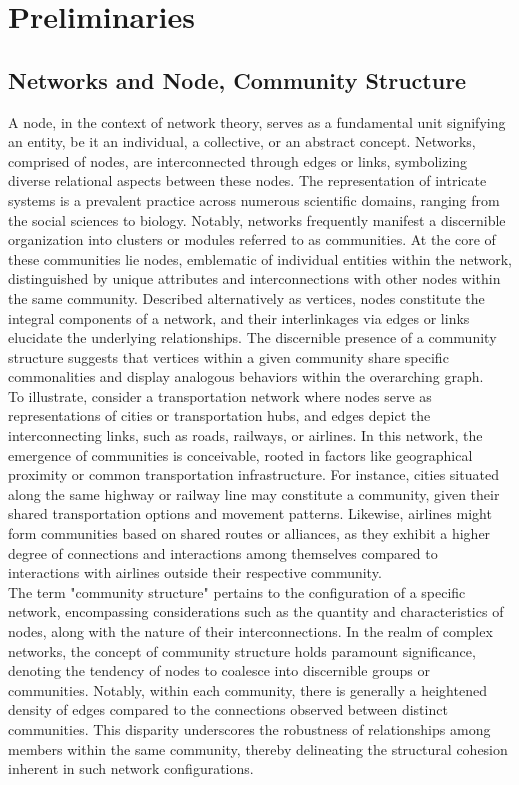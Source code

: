 \section{Preliminaries}
\subsection{Networks and Node, Community Structure}

\indent A node, in the context of network theory, serves as a fundamental unit signifying an entity, be it an individual, a collective, or an abstract concept. Networks, comprised of nodes, are interconnected through edges or links, symbolizing diverse relational aspects between these nodes. The representation of intricate systems is a prevalent practice across numerous scientific domains, ranging from the social sciences to biology. Notably, networks frequently manifest a discernible organization into clusters or modules referred to as communities. At the core of these communities lie nodes, emblematic of individual entities within the network, distinguished by unique attributes and interconnections with other nodes within the same community. Described alternatively as vertices, nodes constitute the integral components of a network, and their interlinkages via edges or links elucidate the underlying relationships. The discernible presence of a community structure suggests that vertices within a given community share specific commonalities and display analogous behaviors within the overarching graph. \\

To illustrate, consider a transportation network where nodes serve as representations of cities or transportation hubs, and edges depict the interconnecting links, such as roads, railways, or airlines. In this network, the emergence of communities is conceivable, rooted in factors like geographical proximity or common transportation infrastructure. For instance, cities situated along the same highway or railway line may constitute a community, given their shared transportation options and movement patterns. Likewise, airlines might form communities based on shared routes or alliances, as they exhibit a higher degree of connections and interactions among themselves compared to interactions with airlines outside their respective community.\\

The term "community structure" pertains to the configuration of a specific network, encompassing considerations such as the quantity and characteristics of nodes, along with the nature of their interconnections. In the realm of complex networks, the concept of community structure holds paramount significance, denoting the tendency of nodes to coalesce into discernible groups or communities. Notably, within each community, there is generally a heightened density of edges compared to the connections observed between distinct communities. This disparity underscores the robustness of relationships among members within the same community, thereby delineating the structural cohesion inherent in such network configurations.\\ 

